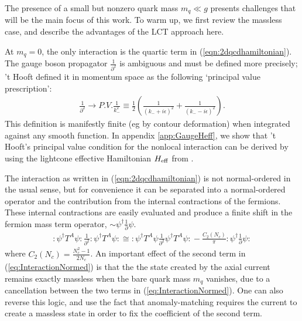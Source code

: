 \documentclass[12pt]{article}
\newcommand{\be}{\begin{eqnarray}}
\newcommand{\ee}{\end{eqnarray}}
\begin{document}
The presence of a small but nonzero quark mass $m_q \ll g$ presents challenges that will be the main focus of this work.  To warm up, we first review the massless case, and describe the advantages of the LCT approach here. 

At $m_q=0$, the only interaction is the quartic term in (\ref{eqn:2dqcdhamiltonian}).  The gauge boson propagator $\frac{1}{\partial^2}$ is ambiguous and must be defined more precisely; 't Hooft \cite{t1993two} defined it in momentum space as the following `principal value prescription':
\be
\frac{1}{\partial^2} \rightarrow P.V. \frac{1}{k_-^2} \equiv \frac{1}{2}\left( \frac{1}{(k_-+ i \epsilon)^2}+ \frac{1}{(k_-- i \epsilon)^2}\right).
\label{eq:PV}
\ee
This definition is manifestly finite (eg  by contour deformation) when integrated against any smooth function. 
 In appendix \ref{app:GaugeHeff}, we show that 't Hooft's principal value condition for the nonlocal interaction can be derived by using the lightcone effective Hamiltonian $H_{\rm eff}$ from \cite{Fitzpatrick:2018ttk}.




 The interaction as written in (\ref{eqn:2dqcdhamiltonian}) is not normal-ordered in the usual sense, but for convenience it can be separated  into a normal-ordered operator and  the contribution from the internal contractions of the fermions.  These internal contractions are easily evaluated and produce a finite shift in the fermion mass term operator, $\sim \psi^\dagger \frac{1}{\partial} \psi$.
\be
\mathbf{:}\psi^\dagger T^A \psi \mathbf{:} \frac{1}{\partial^2} \mathbf{:} \psi^\dagger T^A \psi \mathbf{:} \cong \mathbf{:} \psi^\dagger T^A \psi \frac{1}{\partial^2} \psi^\dagger T^A \psi\mathbf{:} - \frac{C_2(N_c)}{\pi}\mathbf{:}\psi^\dagger \frac{1}{\partial} \psi\mathbf{:} 
\label{eq:InteractionNormed}
\ee
where $C_2(N_c)= \frac{N_c^2-1}{2N_c}$. An important effect of the second term in (\ref{eq:InteractionNormed}) is that the the state created by the axial current remains exactly massless when the bare quark mass $m_q$ vanishes, due to a cancellation between the two terms in (\ref{eq:InteractionNormed}).  One can also reverse this logic, and use the fact that anomaly-matching requires the current to create a massless state in order to fix the coefficient of the second term. 
\end{document}
